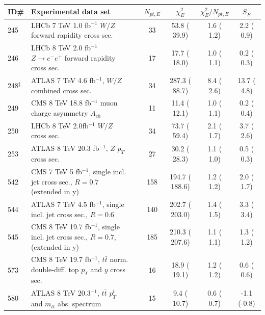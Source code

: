 \begin{widetext}
\begingroup
\squeezetable
\begin{table}[tb]
\begin{tabular}{|l|lr|c|c|c|c|}
\hline
\textbf{ID\# }  & \textbf{Experimental data set} &  & $N_{pt, E}$  & $\chi^2_E$ & $\chi^{2}_E/N_{pt, E}$  & $S_E$ \tabularnewline
\hline
\hline
 245 & LHCb 7 TeV 1.0 fb$^{-1}$ $W/Z$ forward rapidity cross sec.                          & \cite{Aaij:2015gna}        &  33  &   53.8 (  39.9) &  1.6 (  1.2) &  2.2 ( 0.9) \tabularnewline\hline
 246 & LHCb 8 TeV  2.0 fb$^{-1}$ $Z\rightarrow e^{-} e^{+}$ forward rapidity cross sec.    & \cite{Aaij:2015vua}        &  17  &   17.7 (  18.0) &  1.0 (  1.1) &  0.2 ( 0.3) \tabularnewline\hline
 248$^{\ddagger}$ & ATLAS 7 TeV 4.6 fb$^{-1}$, $W/Z$ combined cross sec.                   & \cite{Aaboud:2016btc}      &  34  &  287.3 (  88.7) &  8.4 (  2.6) & 13.7 ( 4.8) \tabularnewline\hline
 249 & CMS 8 TeV 18.8 fb$^{-1}$ muon charge asymmetry $A_{ch}$                                & \cite{Khachatryan:2016pev} &  11  &   11.4 (  12.1) &  1.0 (  1.1) &  0.2 ( 0.4) \tabularnewline\hline
 250 & LHCb 8 TeV 2.0fb$^{-1}$ $W/Z$ cross sec.                                            & \cite{Aaij:2015zlq}        &  34  &   73.7 (  59.4) &  2.1 (  1.7) &  3.7 ( 2.6) \tabularnewline\hline 
 253 & ATLAS 8 TeV 20.3 fb$^{-1}$, $Z$ $p_T$ cross sec.                                    & \cite{Aad:2015auj}         &  27  &   30.2 (  28.3) &  1.1 (  1.0) &  0.5 ( 0.3) \tabularnewline\hline
 542 & CMS 7 TeV 5 fb$^{-1}$, single incl. jet cross sec., $R=0.7$ (extended in y)         & \cite{Chatrchyan:2014gia}  & 158  &  194.7 ( 188.6) &  1.2 (  1.2) &  2.0 ( 1.7) \tabularnewline\hline
 544 & ATLAS 7 TeV  4.5 fb$^{-1}$, single incl. jet cross sec., $R=0.6$                    & \cite{Aad:2014vwa}         & 140  &  202.7 ( 203.0) &  1.4 (  1.5) &  3.3 ( 3.4) \tabularnewline\hline
 545 & CMS 8 TeV 19.7 fb$^{-1}$, single incl. jet cross sec., $R=0.7$, (extended in y)     & \cite{Khachatryan:2016mlc} & 185  &  210.3 ( 207.6) &  1.1 (  1.1) &  1.3 ( 1.2) \tabularnewline\hline
 573 & CMS 8 TeV 19.7 fb$^{-1}$, $t\bar{t}$ norm. double-diff. top $p_T$ and $y$ cross sec. & \cite{Sirunyan:2017azo}    &  16  &   18.9 (  19.1) &  1.2 (  1.2) &  0.6 ( 0.6) \tabularnewline\hline
 580 & ATLAS 8 TeV 20.3$^{-1}$, $t\bar{t}$ $p_{T}^{t}$ and $m_{t\bar{t}}$ abs. spectrum    & \cite{Aad:2015mbv}         &  15  &    9.4 (  10.7) &  0.6 (  0.7) & -1.1 (-0.8) \tabularnewline

\end{tabular}
\end{table}
\end{widetext}
